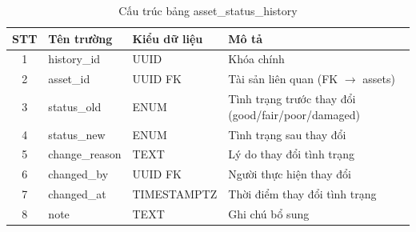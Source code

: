 \renewcommand{\arraystretch}{1.3}
\begin{longtable}{|c|p{3.5cm}|p{4cm}|p{6cm}|}
    \caption{Cấu trúc bảng asset\_status\_history}
    \label{tab:db_asset_status_history} \\

    \hline
    \textbf{STT} & \textbf{Tên trường} & \textbf{Kiểu dữ liệu} & \textbf{Mô tả} \\ \hline
    \endfirsthead

    \hline
    \endhead
    \hline
    \endfoot
    \hline
    \endlastfoot

    1 & history\_id & UUID & Khóa chính \\ \hline
    2 & asset\_id & UUID FK & Tài sản liên quan (FK $\rightarrow$ assets) \\ \hline
    3 & status\_old & ENUM & Tình trạng trước thay đổi (good/fair/poor/damaged) \\ \hline
    4 & status\_new & ENUM & Tình trạng sau thay đổi \\ \hline
    5 & change\_reason & TEXT & Lý do thay đổi tình trạng \\ \hline
    6 & changed\_by & UUID FK & Người thực hiện thay đổi \\ \hline
    7 & changed\_at & TIMESTAMPTZ & Thời điểm thay đổi tình trạng \\ \hline
    8 & note & TEXT & Ghi chú bổ sung \\
\end{longtable}
